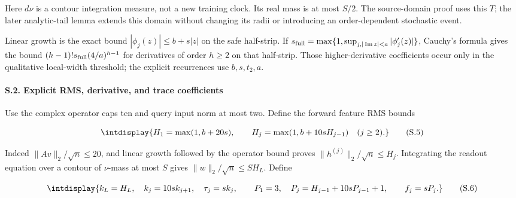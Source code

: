 Here \(d\nu\) is a contour integration measure, not a new training clock. Its real mass is at most \(S/2\). The source-domain proof uses this \(T\); the later analytic-tail lemma extends this domain without changing its radii or introducing an order-dependent stochastic event.



Linear growth is the exact bound \(|\phi_j(z)|\le b+s|z|\) on the safe half-strip. If \(s_{\rm full}=\max\{1,\allowbreak \sup_{j,\allowbreak |\operatorname{Im}z|<a}|\phi'_j(z)|\}\), Cauchy's formula gives the bound \((h-1)!s_{\rm full}(4/a)^{h-1}\) for derivatives of order \(h\ge2\) on that half-strip. Those higher-derivative coefficients occur only in the qualitative local-width threshold; the explicit recurrences use \(b,\allowbreak s,\allowbreak t_2,\allowbreak a\).


\paragraph{S.2. Explicit RMS, derivative, and trace coefficients}

\mbox{}\par\smallskip


Use the complex operator caps ten and query input norm at most two. Define the forward feature RMS bounds


\begingroup\renewcommand{\theHequation}{intdisplay.366}
\begin{equation}
\intdisplay{
H_1=\max(1,b+20s),\qquad H_j=\max(1,b+10sH_{j-1})\quad(j\ge2).
}
\tag{S.5}
\label{int:eq-0179-s-5}
\end{equation}
\endgroup


Indeed \(\|Av\|_2/\sqrt n\le20\), and linear growth followed by the operator bound proves \(\|h^{(j)}\|_2/\sqrt n\le H_j\). Integrating the readout equation over a contour of \(\nu\)-mass at most \(S\) gives \(\|w\|_2/\sqrt n\le SH_L\). Define


\begingroup\renewcommand{\theHequation}{intdisplay.367}
\begin{equation}
\intdisplay{
k_L=H_L,\quad k_j=10s k_{j+1},\quad \tau_j=sk_j,
\qquad P_1=3,\quad P_j=H_{j-1}+10sP_{j-1}+1,
\qquad f_j=sP_j.
}
\tag{S.6}
\label{int:eq-0180-s-6}
\end{equation}
\endgroup

